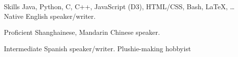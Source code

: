 
\begin{rubric}{Skills}
\entry*[Code]
	Java, Python, C, C++, JavaScript (D3), HTML/CSS, Bash, \LaTeX, \ldots
\entry*[Languages]
	Native English speaker/writer.
	\par Proficient Shanghainese, Mandarin Chinese speaker.
	\par Intermediate Spanish speaker/writer.
\entry*[Misc.]
    Plushie-making hobbyist
\end{rubric}
